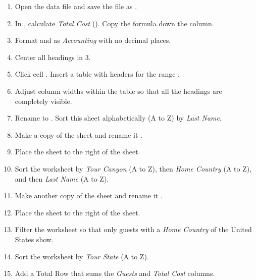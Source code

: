 \begin{enumerate}
	\item Open the data file  and save the file as .
	\item In , calculate \textit{Total Cost} (). Copy the formula down the column.
	\item Format  and  as \textit{Accounting} with no decimal places.
	\item Center all headings in $ 3 $.
	\item Click cell . Insert a table with headers for the range .
	\item Adjust column widths within the table so that all the headings are completely visible.
	\item Rename  to . Sort this sheet alphabetically (A to Z) by \textit{Last Name}.

	\item Make a copy of the  sheet and rename it .
	\item Place the  sheet to the right of the  sheet.
	\item Sort the  worksheet by \textit{Tour Canyon} (A to Z), then \textit{Home Country} (A to Z), and then \textit{Last Name} (A to Z).

	\item Make another copy of the  sheet and rename it .
	\item Place the  sheet to the right of the  sheet.
	\item Filter the  worksheet so that only guests with a \textit{Home Country} of the United States show. 
	\item Sort the worksheet by \textit{Tour State} (A to Z).
	\item Add a Total Row that sums the \textit{Guests} and \textit{Total Cost} columns.


\end{enumerate}
